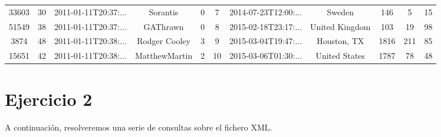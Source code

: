 \documentclass[12pt,a4paper,twoside,openright,titlepage,final]{article}
\begin{document}
\begin{table}[htbp!]
{\begin{tabular}{@{}ccccccccccc@{}}
			33603              & 30           & 2011-01-11T20:37:...  & Sorantis             & 0                  & 7           & 2014-07-23T12:00:...    & Sweden               & 146                 & 5                & 15             \\
			51549              & 38           & 2011-01-11T20:37:...  & GAThrawn             & 0                  & 8           & 2015-02-18T23:17:...    & United Kingdom       & 103                 & 19               & 98             \\
			3874               & 48           & 2011-01-11T20:38:...  & Rodger Cooley        & 3                  & 9           & 2015-03-04T19:47:...    & Houston, TX          & 1816                & 211              & 85             \\
			15651              & 42           & 2011-01-11T20:38:...  & MatthewMartin        & 2            & 10          & 2015-03-06T01:30:...    & United States        & 1787                & 78               & 48             \\ \bottomrule
		\end{tabular}%
	}
\end{table}

\section{Ejercicio 2}
A continuación, resolveremos una serie de consultas sobre el fichero XML.
\end{document}
